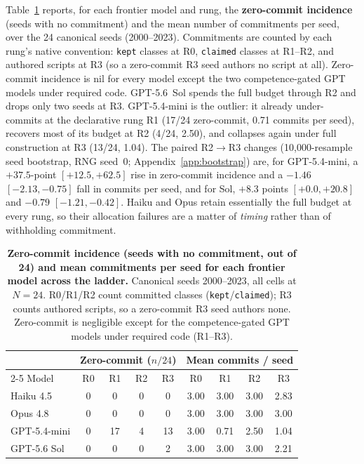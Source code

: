 \documentclass{article}
\begin{document}
Table~\ref{tab:zero-commit} reports, for each frontier model and rung, the \textbf{zero-commit incidence} (seeds with no commitment) and the mean number of commitments per seed, over the 24 canonical seeds (2000--2023). Commitments are counted by each rung's native convention: \texttt{kept} classes at R0, \texttt{claimed} classes at R1--R2, and authored scripts at R3 (so a zero-commit R3 seed authors no script at all). Zero-commit incidence is nil for every model except the two competence-gated GPT models under required code. GPT-5.6~Sol spends the full budget through R2 and drops only two seeds at R3. GPT-5.4-mini is the outlier: it already under-commits at the declarative rung R1 (17/24 zero-commit, 0.71 commits per seed), recovers most of its budget at R2 (4/24, 2.50), and collapses again under full construction at R3 (13/24, 1.04). The paired R2$\to$R3 changes (10{,}000-resample seed bootstrap, RNG seed~0; Appendix~\ref{app:bootstrap}) are, for GPT-5.4-mini, a $+37.5$-point $[+12.5,+62.5]$ rise in zero-commit incidence and a $-1.46$ $[-2.13,-0.75]$ fall in commits per seed, and for Sol, $+8.3$ points $[+0.0,+20.8]$ and $-0.79$ $[-1.21,-0.42]$. Haiku and Opus retain essentially the full budget at every rung, so their allocation failures are a matter of \emph{timing} rather than of withholding commitment.

\begin{table}[H]
\centering \caption{\textbf{Zero-commit incidence (seeds with no commitment, out of 24) and mean commitments per seed for each frontier model across the ladder.} Canonical seeds 2000--2023, all cells at $N=24$. R0/R1/R2 count committed classes (\texttt{kept}/\texttt{claimed}); R3 counts authored scripts, so a zero-commit R3 seed authors none. Zero-commit is negligible except for the competence-gated GPT models under required code (R1--R3).} \label{tab:zero-commit} \small
\begin{tabular}{@{}lcccccccc@{}}
\hline
 & \multicolumn{4}{c}{Zero-commit ($n/24$)} & \multicolumn{4}{c}{Mean commits / seed} \\
\cline{2-5}\cline{6-9}
Model & R0 & R1 & R2 & R3 & R0 & R1 & R2 & R3 \\
\hline
Haiku 4.5    & 0 & 0  & 0 & 0  & 3.00 & 3.00 & 3.00 & 2.83 \\
Opus 4.8     & 0 & 0  & 0 & 0  & 3.00 & 3.00 & 3.00 & 3.00 \\
GPT-5.4-mini & 0 & 17 & 4 & 13 & 3.00 & 0.71 & 2.50 & 1.04 \\
GPT-5.6 Sol  & 0 & 0  & 0 & 2  & 3.00 & 3.00 & 3.00 & 2.21 \\
\hline
\end{tabular}
\end{table}
\end{document}
